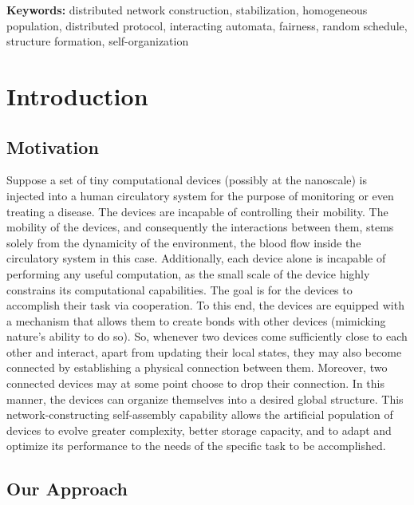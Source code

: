\documentclass[oribibl, 11pt]{llncs}
\begin{document}
\noindent
\textbf{Keywords:} distributed network construction, stabilization, homogeneous population, distributed protocol, interacting automata, fairness, random schedule, structure formation, self-organization

\section{Introduction}
\label{sec:intro}

\subsection{Motivation}

Suppose a set of tiny computational devices (possibly at the nanoscale) is injected into a human circulatory system for the purpose of monitoring or even treating a disease. The devices are incapable of controlling their mobility. The mobility of the devices, and consequently the interactions between them, stems solely from the dynamicity of the environment, the blood flow inside the circulatory system in this case. Additionally, each device alone is incapable of performing any useful computation, as the small scale of the device highly constrains its computational capabilities. The goal is for the devices to accomplish their task via cooperation. To this end, the devices are equipped with a mechanism that allows them to create bonds with other devices (mimicking nature's ability to do so). So, whenever two devices come sufficiently close to each other and interact, apart from updating their local states, they may also become connected by establishing a physical connection between them. Moreover, two connected devices may at some point choose to drop their connection. In this manner, the devices can organize themselves into a desired global structure. This network-constructing self-assembly capability allows the artificial population of devices to evolve greater complexity, better storage capacity, and to adapt and optimize its performance to the needs of the specific task to be accomplished.

\subsection{Our Approach}
\end{document}
